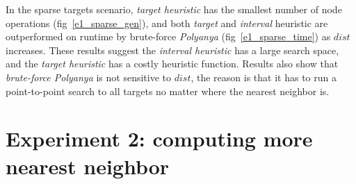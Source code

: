 In the sparse targets scenario, \textit{target heuristic} has the smallest number of node
operations (fig~\ref{e1_sparse_gen}), 
and both \textit{target} and \textit{interval} heuristic are outperformed on runtime by brute-force \textit{Polyanya} (fig~\ref{e1_sparse_time}) as $dist$ increases.
These results suggest the \textit{interval heuristic} has a large search space, and the
\textit{target heuristic} has a costly heuristic function. Results also show that \textit{brute-force Polyanya} is
not sensitive to $dist$, the reason is that it has to run a point-to-point search to all
targets no matter where the nearest neighbor is. 

\section{Experiment 2: computing more nearest neighbor}
